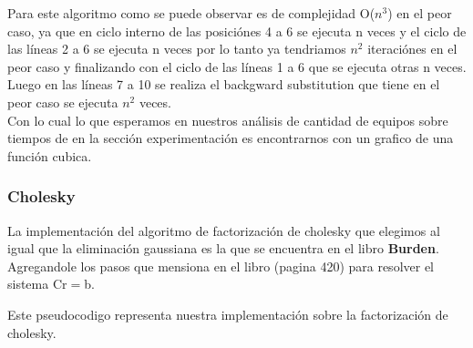 Para este algoritmo como se puede observar es de complejidad O($n^3$) en el peor caso, ya que en ciclo interno de las posici\'ones 4 a 6 se ejecuta n veces
y el ciclo de las l\'ineas 2 a 6 se ejecuta n veces por lo tanto ya tendriamos $n^2$ iteraci\'ones en el peor caso y finalizando con el ciclo de las l\'ineas 1 a 6 que se ejecuta otras n veces.
Luego en las l\'ineas 7 a 10 se realiza el backgward substitution  que tiene en el peor caso se ejecuta $n^2$ veces.\\
Con lo cual lo que esperamos en nuestros an\'alisis de cantidad de equipos sobre tiempos de en la secci\'on experimentaci\'on es encontrarnos con un grafico de una funci\'on cubica.

\newpage
\subsubsection{Cholesky}

La implementación del algoritmo de factorizaci\'on de cholesky que elegimos al igual que la eliminaci\'on gaussiana es la que se encuentra en el libro \textbf{Burden}.
Agregandole los pasos que mensiona en el libro (pagina 420) para resolver el sistema Cr$=$b.

Este pseudocodigo representa nuestra implementaci\'on sobre la factorizaci\'on de cholesky.

